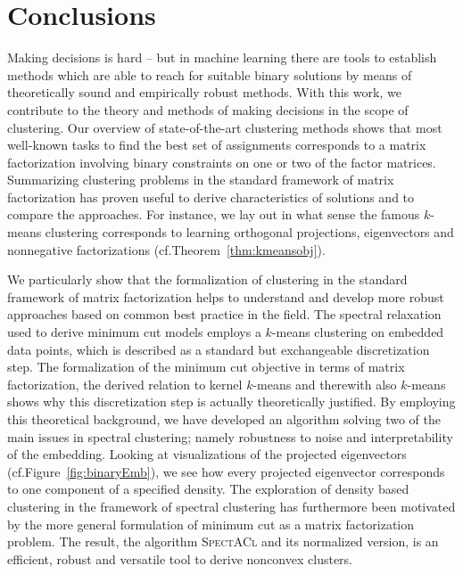 \chapter{Conclusions}\label{chap:Conclusions}
Making decisions is hard -- but in machine learning there are tools to establish methods which are able to reach for suitable binary solutions by means of theoretically sound and empirically robust methods. With this work, we contribute to the theory and methods of making decisions in the scope of clustering. Our overview of state-of-the-art clustering methods shows that most well-known tasks to find the best set of assignments corresponds to a matrix factorization involving binary constraints on one or two of the factor matrices. Summarizing clustering problems in the standard framework of matrix factorization has proven useful to derive characteristics of solutions and to compare the approaches. For instance, we lay out in what sense the famous $k$-means clustering corresponds to learning orthogonal projections, eigenvectors and nonnegative factorizations (cf.\@ Theorem~\ref{thm:kmeansobj}).  

We particularly show that the formalization of clustering in the standard framework of matrix factorization helps to understand and develop more robust approaches based on common best practice in the field. The spectral relaxation used to derive minimum cut models employs a $k$-means clustering on embedded data points, which is described as a standard but exchangeable discretization step. The formalization of the minimum cut objective in terms of matrix factorization, the derived relation to kernel $k$-means and therewith also $k$-means shows why this discretization step is actually theoretically justified. By employing this theoretical background, we have developed an algorithm solving two of the main issues in spectral clustering; namely robustness to noise and interpretability of the embedding. Looking at visualizations of the projected eigenvectors (cf.\@ Figure~\ref{fig:binaryEmb}), we see how every projected eigenvector corresponds to one component of a specified density. The exploration of density based clustering in the framework of spectral clustering has furthermore been motivated by the more general formulation of minimum cut as a matrix factorization problem. The result, the algorithm \textsc{SpectACl} and its normalized version, is an efficient, robust and versatile tool to derive nonconvex clusters.

